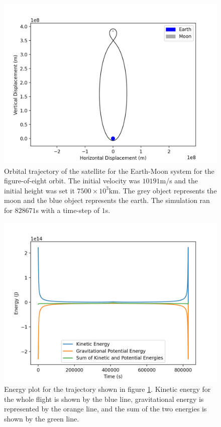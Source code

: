 \documentclass[twocolumn, prl, nobalancelastpage, aps, citeautoscript, longbibliography, 10pt]{revtex4-1}
\begin{document}
\begin{figure}[p!]
    \includegraphics[width = 0.96\linewidth]{Figureo8Orbit.png}
    \caption{Orbital trajectory of the satellite for the Earth-Moon system for the figure-of-eight orbit. The initial velocity was $10191$m/s and the initial height was set it $7500\times10^3$km. The grey object represents
    the moon and the blue object represents the earth. The simulation ran for $828671$s with a time-step of $1$s.}
    \label{Figureof8Orbit}
\end{figure}
\begin{figure}[p!]
    \includegraphics[width = 0.96\linewidth]{Figureo8Energy.png}
    \caption{Energy plot for the trajectory shown in figure \ref{Figureof8Orbit}. Kinetic energy for the whole flight is shown by the blue line, gravitational energy 
    is represented by the orange line, and the sum of the two energies is shown by the green line. }
    \label{SlingshotEnergy}
\end{figure}
\end{document}
